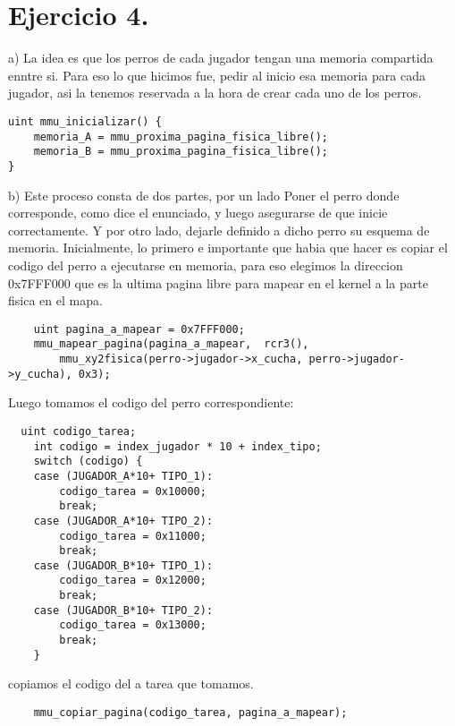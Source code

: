 \section{Ejercicio 4.}
a)
La idea es que los perros de cada jugador tengan una memoria compartida enntre si.
Para eso lo que hicimos fue, pedir al inicio esa memoria para cada jugador, asi la tenemos reservada a la hora de crear cada uno de los perros.
\begin{codesnippet}
\begin{verbatim}
uint mmu_inicializar() {
    memoria_A = mmu_proxima_pagina_fisica_libre();
    memoria_B = mmu_proxima_pagina_fisica_libre();
}
    \end{verbatim}
\end{codesnippet}

b)
Este proceso consta de dos partes, por un lado Poner el perro donde corresponde, como dice el enunciado, y luego asegurarse de que inicie correctamente. Y por otro lado, dejarle definido a dicho perro su esquema de memoria.
Inicialmente, lo primero e importante que habia que hacer es copiar el codigo del perro a ejecutarse en memoria, para eso elegimos la direccion 0x7FFF000 que es la ultima pagina libre para mapear en el kernel a la parte fisica en el mapa.
\begin{codesnippet}
\begin{verbatim}
	uint pagina_a_mapear = 0x7FFF000;
    mmu_mapear_pagina(pagina_a_mapear,  rcr3(), 
    	mmu_xy2fisica(perro->jugador->x_cucha, perro->jugador->y_cucha), 0x3); 
    \end{verbatim}
\end{codesnippet}

Luego tomamos el codigo del perro correspondiente:    
\begin{codesnippet}
\begin{verbatim}
  uint codigo_tarea;
    int codigo = index_jugador * 10 + index_tipo;
    switch (codigo) {
    case (JUGADOR_A*10+ TIPO_1):
        codigo_tarea = 0x10000;
        break;
    case (JUGADOR_A*10+ TIPO_2):
        codigo_tarea = 0x11000;
        break;
    case (JUGADOR_B*10+ TIPO_1):
        codigo_tarea = 0x12000;
        break;
    case (JUGADOR_B*10+ TIPO_2):
        codigo_tarea = 0x13000;
        break;
    }
    \end{verbatim}
\end{codesnippet}


copiamos el codigo del a tarea que tomamos.
\begin{codesnippet}
\begin{verbatim}
    mmu_copiar_pagina(codigo_tarea, pagina_a_mapear);
        \end{verbatim}
\end{codesnippet}


